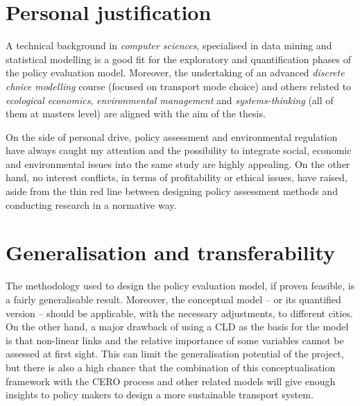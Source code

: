 \section{Personal justification}
\label{s:personal-justification}
A technical background in \textit{computer sciences}, specialised in data mining and statistical modelling is a good fit for the exploratory and quantification phases of the policy evaluation model. Moreover, the undertaking of an advanced \textit{discrete choice modelling} course (focused on transport mode choice) and others related to \textit{ecological economics}, \textit{environmental management} and \textit{systems-thinking} (all of them at masters level) are aligned with the aim of the thesis.

On the side of personal drive, policy assessment and environmental regulation have always caught my attention and the possibility to integrate social, economic and environmental issues into the same study are highly appealing. On the other hand, no interest conflicts, in terms of profitability or ethical issues, have raised, aside from the thin red line between designing policy assessment methods and conducting research in a normative way.

\section{Generalisation and transferability}
\label{s:generalisation}
The methodology used to design the policy evaluation model, if proven feasible, is a fairly generalisable result. Moreover, the conceptual model -- or its quantified version -- should be applicable, with the necessary adjustments, to different cities. On the other hand, a major drawback of using a CLD as the basis for the model is that non-linear links and the relative importance of some variables cannot be assessed at first sight. This can limit the generalisation potential of the project, but there is also a high chance that the combination of this conceptualisation framework with the CERO process and other related models will give enough insights to policy makers to design a more sustainable transport system.